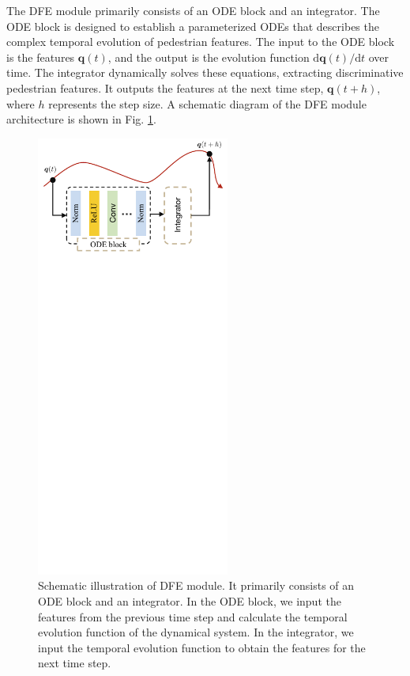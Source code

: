 \documentclass[12pt]{spieman}  %
\begin{document}
\begin{spacing}{2}
The DFE module primarily consists of an ODE block and an integrator. The ODE block is designed to establish a parameterized ODEs that describes the complex temporal evolution of pedestrian features. The input to the ODE block is the features $\boldsymbol{q}(t)$, and the output is the evolution function ${\mathrm{d}\boldsymbol{q}(t)}/{\mathrm{d}t}$ over time. The integrator dynamically solves these equations, extracting discriminative pedestrian features. It outputs the features at the next time step, $\boldsymbol{q}(t + h)$, where $h$ represents the step size. A schematic diagram of the DFE module architecture is shown in Fig. \ref{fig:ode_module}.

\begin{figure}[!htbp]
	\centering
	\includegraphics[width=2.5in]{Figure_2}
	\caption{Schematic illustration of DFE module. It primarily consists of an ODE block and an integrator. In the ODE block, we input the features from the previous time step and calculate the temporal evolution function of the dynamical system. In the integrator, we input the temporal evolution function to obtain the features for the next time step.}
	\label{fig:ode_module}
\end{figure}


\end{spacing}
\end{document}
